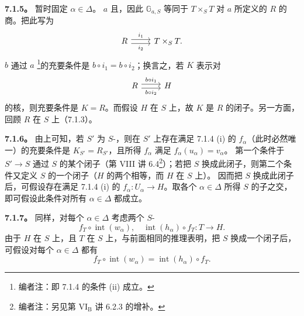 \textbf{7.1.5。} 暂时固定 $\alpha\in\Delta$。 $a$ 且，因此 $\mathbb G_{a,S}$ 等同于 $T\times_ST$ 对 $a$ 所定义的 $R$ 的商。把此写为
\[\begin{tikzcd}R\arrow[r,shift left,"i_1"]\arrow[r,shift right,"i_2"']&T\times_ST.\end{tikzcd}\]
 $b$ 通过 $a$ \footnote{编者注：即 7.1.4 的条件 (ii) 成立。}的充要条件是 $b\circ i_1=b\circ i_2$；换言之，若 $K$ 表示对
\[\begin{tikzcd}R\arrow[r,shift left,"b\circ i_1"]\arrow[r,shift right,"b\circ i_2"']&H\end{tikzcd}\]
的核，则充要条件是 $K=R$。而假设 $H$ 在 $S$ 上，故 $K$ 是 $R$ 的闭子。另一方面，回顾 $R$ 在 $S$ 上（7.1.3）。

\textbf{7.1.6。} 由上可知，若 $S'$ 为 $S$-，则在 $S'$ 上存在满足 7.1.4 (i) 的 $f_\alpha$（此时必然唯一）的充要条件是 $K_{S'}=R_{S'}$，且所得 $f_\alpha$ 满足 $f_\alpha(u_\alpha)=v_\alpha$。
第一个条件于 $S'\to S$ 通过 $S$ 的某个闭子（第 VIII 讲 6.4\footnote{编者注：另见第 VI$_{\mathrm B}$ 讲 6.2.3 的增补。}）；若把 $S$ 换成此闭子，则第二个条件又定义 $S$ 的一个闭子（$H$ 的两个相等，而 $H$ 在 $S$ 上）。
因而把 $S$ 换成此闭子后，可假设存在满足 7.1.4 (i) 的 $f_\alpha:U_\alpha\to H$。取各个 $\alpha\in\Delta$ 所得 $S$ 的子之交，即可假设此条件对所有 $\alpha\in\Delta$ 都成立。

\textbf{7.1.7。} 同样，对每个 $\alpha\in\Delta$ 考虑两个 $S$-
\[f_T\circ\operatorname{int}(w_\alpha),\quad\operatorname{int}(h_\alpha)\circ f_T:T\longrightarrow H.\]
由于 $H$ 在 $S$ 上，且 $T$ 在 $S$ 上，与前面相同的推理表明，把 $S$ 换成一个闭子后，可假设对每个 $\alpha\in\Delta$ 都有
\[f_T\circ\operatorname{int}(w_\alpha)=\operatorname{int}(h_\alpha)\circ f_T.\]

